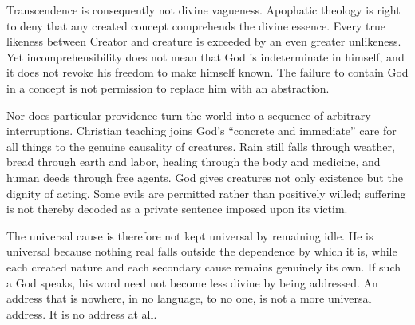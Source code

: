 Transcendence is consequently not divine vagueness. Apophatic theology is right to deny that any created concept comprehends the divine essence. Every true likeness between Creator and creature is exceeded by an even greater unlikeness. Yet incomprehensibility does not mean that God is indeterminate in himself, and it does not revoke his freedom to make himself known. The failure to contain God in a concept is not permission to replace him with an abstraction.

Nor does particular providence turn the world into a sequence of arbitrary interruptions. Christian teaching joins God's ``concrete and immediate'' care for all things to the genuine causality of creatures. Rain still falls through weather, bread through earth and labor, healing through the body and medicine, and human deeds through free agents. God gives creatures not only existence but the dignity of acting. Some evils are permitted rather than positively willed; suffering is not thereby decoded as a private sentence imposed upon its victim.

The universal cause is therefore not kept universal by remaining idle. He is universal because nothing real falls outside the dependence by which it is, while each created nature and each secondary cause remains genuinely its own. If such a God speaks, his word need not become less divine by being addressed. An address that is nowhere, in no language, to no one, is not a more universal address. It is no address at all.
